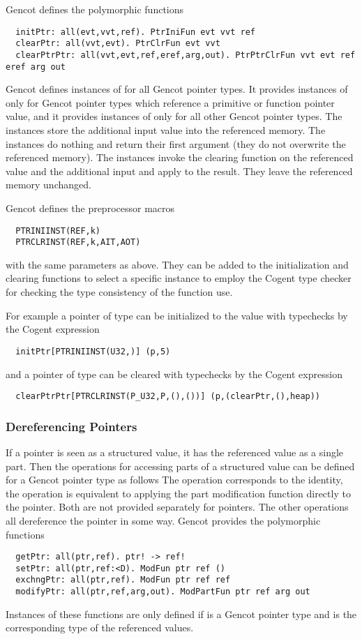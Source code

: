 Gencot defines the polymorphic functions
\begin{verbatim}
  initPtr: all(evt,vvt,ref). PtrIniFun evt vvt ref
  clearPtr: all(vvt,evt). PtrClrFun evt vvt
  clearPtrPtr: all(vvt,evt,ref,eref,arg,out). PtrPtrClrFun vvt evt ref eref arg out
\end{verbatim}
Gencot defines instances of  for all Gencot pointer types. It provides instances of  only for Gencot pointer types which
reference a primitive or function pointer value, and it provides instances of  only for all other Gencot pointer types.
The  instances store the additional input value 
into the referenced memory. The  instances do nothing and return their first argument (they do not overwrite the referenced memory).
The  instances invoke the clearing function on the referenced value and the additional input and apply  to the result.
They leave the referenced memory unchanged. 

Gencot defines the preprocessor macros
\begin{verbatim}
  PTRINIINST(REF,k)
  PTRCLRINST(REF,k,AIT,AOT)
\end{verbatim}
with the same parameters as above. They can be added to the initialization and clearing functions to select a specific instance
to employ the Cogent type checker for checking the type consistency of the function use.

For example a pointer  of type  can be initialized to the value  with typechecks by the Cogent expression
\begin{verbatim}
  initPtr[PTRINIINST(U32,)] (p,5)
\end{verbatim}
and a pointer  of type  can be cleared with typechecks by the Cogent expression
\begin{verbatim}
  clearPtrPtr[PTRCLRINST(P_U32,P,(),())] (p,(clearPtr,(),heap))
\end{verbatim}

\subsubsection{Dereferencing Pointers}

If a pointer is seen as a structured value, it has the referenced value as a single part.
Then the operations for accessing parts of a structured value can be defined for a Gencot pointer type as follows
The operation  corresponds to the identity, the operation  is equivalent to applying the
part modification function directly to the pointer. Both are not provided separately for pointers.
The other operations all dereference the pointer in some way. Gencot provides the polymorphic functions
\begin{verbatim}
  getPtr: all(ptr,ref). ptr! -> ref! 
  setPtr: all(ptr,ref:<D). ModFun ptr ref ()
  exchngPtr: all(ptr,ref). ModFun ptr ref ref
  modifyPtr: all(ptr,ref,arg,out). ModPartFun ptr ref arg out
\end{verbatim}
Instances of these functions are only defined if  is a Gencot pointer type and  is the corresponding
type of the referenced values. 

